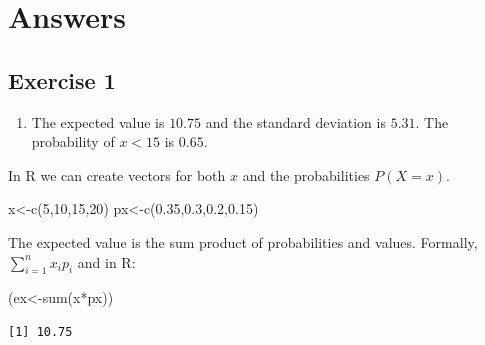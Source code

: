 \documentclass[
  letterpaper,
  DIV=11,
  numbers=noendperiod]{scrreprt}
\newenvironment{Shaded}{\begin{snugshade}}{\end{snugshade}}
\newcommand{\DecValTok}[1]{\textcolor[rgb]{0.68,0.00,0.00}{#1}}
\newcommand{\FloatTok}[1]{\textcolor[rgb]{0.68,0.00,0.00}{#1}}
\newcommand{\FunctionTok}[1]{\textcolor[rgb]{0.28,0.35,0.67}{#1}}
\newcommand{\NormalTok}[1]{\textcolor[rgb]{0.00,0.23,0.31}{#1}}
\newcommand{\OtherTok}[1]{\textcolor[rgb]{0.00,0.23,0.31}{#1}}
\newcommand{\SpecialCharTok}[1]{\textcolor[rgb]{0.37,0.37,0.37}{#1}}
\providecommand{\tightlist}{%
  \setlength{\itemsep}{0pt}\setlength{\parskip}{0pt}}\usepackage{longtable,booktabs,array}
\begin{document}
\hypertarget{answers-8}{%
\section{Answers}\label{answers-8}}

\hypertarget{exercise-1-17}{%
\subsection*{Exercise 1}\label{exercise-1-17}}

\begin{blackbox}

\begin{enumerate}
\def\labelenumi{\arabic{enumi}.}
\tightlist
\item
  The expected value is \(10.75\) and the standard deviation is
  \(5.31\). The probability of \(x<15\) is \(0.65\).
\end{enumerate}

\end{blackbox}

In R we can create vectors for both \(x\) and the probabilities
\(P(X=x)\).

\begin{Shaded}
\begin{Highlighting}[numbers=left,,]
\NormalTok{x}\OtherTok{\textless{}{-}}\FunctionTok{c}\NormalTok{(}\DecValTok{5}\NormalTok{,}\DecValTok{10}\NormalTok{,}\DecValTok{15}\NormalTok{,}\DecValTok{20}\NormalTok{)}
\NormalTok{px}\OtherTok{\textless{}{-}}\FunctionTok{c}\NormalTok{(}\FloatTok{0.35}\NormalTok{,}\FloatTok{0.3}\NormalTok{,}\FloatTok{0.2}\NormalTok{,}\FloatTok{0.15}\NormalTok{)}
\end{Highlighting}
\end{Shaded}

The expected value is the sum product of probabilities and values.
Formally, \(\sum_{i=1}^{n}x_{i}p_{i}\) and in R:

\begin{Shaded}
\begin{Highlighting}[numbers=left,,]
\NormalTok{(ex}\OtherTok{\textless{}{-}}\FunctionTok{sum}\NormalTok{(x}\SpecialCharTok{*}\NormalTok{px))}
\end{Highlighting}
\end{Shaded}

\begin{verbatim}
[1] 10.75
\end{verbatim}
\end{document}
